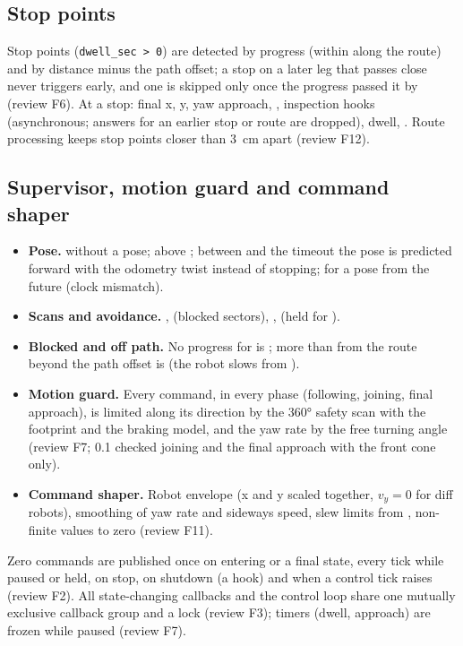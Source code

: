 \subsection{Stop points}

Stop points (\texttt{dwell\_sec > 0}) are detected by progress (within  along
the route) and by distance minus the path offset; a stop on a later leg that passes close never
triggers early, and one is skipped only once the progress passed it by
 (review F6). At a stop: final x, y, yaw approach, ,
inspection hooks (asynchronous; answers for an earlier stop or route are dropped), dwell,
. Route processing keeps stop points closer than 3~cm apart (review F12).

\subsection{Supervisor, motion guard and command shaper}

\begin{itemize}
  \item \textbf{Pose.}  without a pose;  above
    ; between  and the timeout the
    pose is predicted forward with the odometry twist instead of stopping;  for a
    pose from the future (clock mismatch).
  \item \textbf{Scans and avoidance.} ,  (blocked sectors),
    ,  (held for ).
  \item \textbf{Blocked and off path.} No progress for  is
    ; more than  from the route beyond the path offset is
     (the robot slows from ).
  \item \textbf{Motion guard.} Every command, in every phase (following, joining, final
    approach), is limited along its direction by the 360° safety scan with the footprint and the
    braking model, and the yaw rate by the free turning angle (review F7; 0.1 checked joining
    and the final approach with the front cone only).
  \item \textbf{Command shaper.} Robot envelope (x and y scaled together, $v_y = 0$ for diff
    robots), smoothing of yaw rate and sideways speed, slew limits from ,
    non-finite values to zero (review F11).
\end{itemize}
Zero commands are published once on entering  or a final state, every tick while
paused or held, on stop, on shutdown (a hook) and when a control tick raises (review F2). All
state-changing callbacks and the control loop share one mutually exclusive callback group and a
lock (review F3); timers (dwell, approach) are frozen while paused (review F7).

